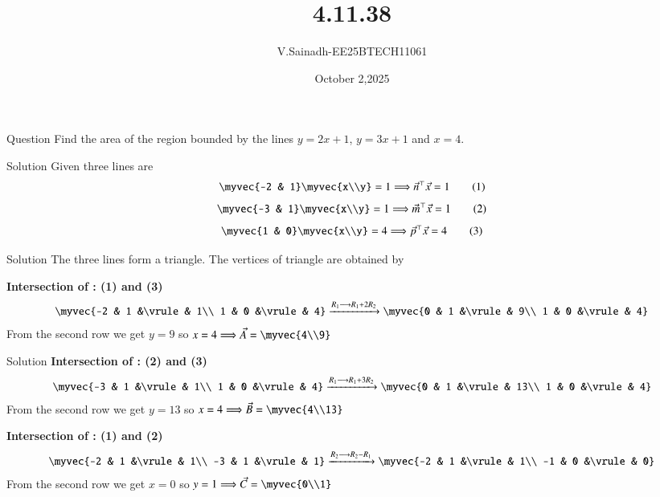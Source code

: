 \documentclass{beamer}
\begin{document}
\title 
{4.11.38}
\date{October 2,2025}
\author 
{V.Sainadh-EE25BTECH11061}
\frame{\titlepage}
\begin{frame}{Question}
Find the area of the region bounded by the lines $y=2x+1$, $y=3x+1$ and $x=4$. \\
\end{frame}
\begin{frame}{Solution}
Given three lines are
\begin{align}
\myvec{-2 & 1}\myvec{x\\y} = 1 \Longrightarrow \vec{n}^\top\vec{x} = 1 \tag{1}
\end{align}
\begin{align}
\myvec{-3 & 1}\myvec{x\\y} = 1 \Longrightarrow \vec{m}^\top\vec{x} = 1 \tag{2}
\end{align}
\begin{align}
\myvec{1 & 0}\myvec{x\\y} = 4 \Longrightarrow \vec{p}^\top\vec{x} = 4 \tag{3}
\end{align}
  \end{frame}
  \begin{frame}{Solution}
  The three lines form a triangle.  
The vertices of triangle are obtained by 

\textbf{Intersection of : (1) and (3)}
\begin{align}
\myvec{-2 & 1 &\vrule& 1\\
1 & 0 &\vrule& 4} \xrightarrow{R_1 \longrightarrow R_1+2R_2}
\myvec{0 & 1 &\vrule& 9\\
1 & 0 &\vrule& 4}
\end{align}
From the second row we get $y=9$ so $x=4 \Longrightarrow
\vec{A} = \myvec{4\\9}$
\end{frame}

\begin{frame}{Solution}
\textbf{Intersection of : (2) and (3)}
\begin{align}
\myvec{-3 & 1 &\vrule& 1\\
1 & 0 &\vrule& 4} \xrightarrow{R_1 \longrightarrow R_1+3R_2}
\myvec{0 & 1 &\vrule& 13\\
1 & 0 &\vrule& 4}
\end{align}
From the second row we get $y=13$ so $x=4 \Longrightarrow
\vec{B} = \myvec{4\\13}$

\textbf{Intersection of : (1) and (2)}
\begin{align}
\myvec{-2 & 1 &\vrule& 1\\
-3 & 1 &\vrule& 1} \xrightarrow{R_2 \longrightarrow R_2-R_1}
\myvec{-2 & 1 &\vrule& 1\\
-1 & 0 &\vrule& 0}
\end{align}
From the second row we get $x=0$ so $y=1 \Longrightarrow
\vec{C} = \myvec{0\\1}$

\end{frame}
\end{document}
